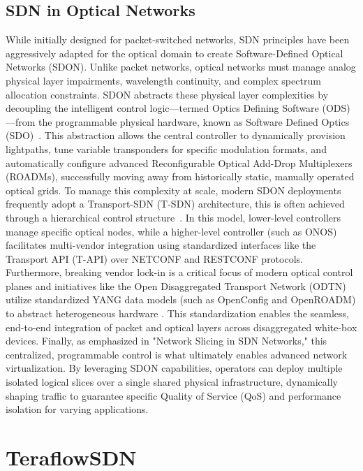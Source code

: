\subsection{SDN in Optical Networks}
While initially designed for packet-switched networks, SDN principles have been aggressively adapted for the optical domain to create Software-Defined Optical Networks (SDON). Unlike packet networks, optical networks must manage analog physical layer impairments, wavelength continuity, and complex spectrum allocation constraints. SDON abstracts these physical layer complexities by decoupling the intelligent control logic—termed Optics Defining Software (ODS)—from the programmable physical hardware, known as Software Defined Optics (SDO)~\cite{softwareDefinedOpticalNetwork}. This abstraction allows the central controller to dynamically provision lightpaths, tune variable transponders for specific modulation formats, and automatically configure advanced Reconfigurable Optical Add-Drop Multiplexers (ROADMs), successfully moving away from historically static, manually operated optical grids. To manage this complexity at scale, modern SDON deployments frequently adopt a Transport-SDN (T-SDN) architecture, this is often achieved through a hierarchical control structure~\cite{largeScaleOpticalSDN}. In this model, lower-level controllers manage specific optical nodes, while a higher-level controller (such as ONOS) facilitates multi-vendor integration using standardized interfaces like the Transport API (T-API) over NETCONF and RESTCONF protocols.
Furthermore, breaking vendor lock-in is a critical focus of modern optical control planes and initiatives like the Open Disaggregated Transport Network (ODTN) utilize standardized YANG data models (such as OpenConfig and OpenROADM) to abstract heterogeneous hardware \cite{odtn}. This standardization enables the seamless, end-to-end integration of packet and optical layers across disaggregated white-box devices. Finally, as emphasized in "Network Slicing in SDN Networks," this centralized, programmable control is what ultimately enables advanced network virtualization. By leveraging SDON capabilities, operators can deploy multiple isolated logical slices over a single shared physical infrastructure, dynamically shaping traffic to guarantee specific Quality of Service (QoS) and performance isolation for varying applications.
\section{TeraflowSDN}
